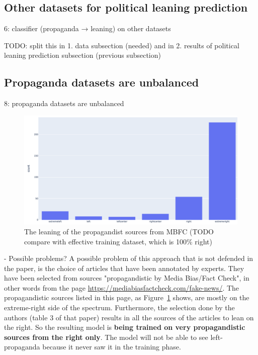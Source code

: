 \subsection{Other datasets for political leaning prediction}
6: classifier (propaganda → leaning) on other datasets

TODO: split this in 
1. data subsection (needed) and in
2. results of political leaning prediction subsection (previous subsection)

\subsection{Propaganda datasets are unbalanced}

8: propaganda datasets are unbalanced

\begin{figure}[!htb]
   \centering
   \includegraphics[width=\linewidth]{figures/leaning_questionable.png}
   \caption{The leaning of the propagandist sources from MBFC (TODO compare with effective training dataset, which is 100\% right)}
   \label{fig:mbfc_leaning}
\end{figure}

- Possible problems?
A possible problem of this approach that is not defended in the paper, is the choice of articles that have been annotated by experts. They have been selected from sources "propagandistic by Media Bias/Fact Check", in other words from the page \url{https://mediabiasfactcheck.com/fake-news/}. The propagandistic sources listed in this page, as Figure~\ref{fig:mbfc_leaning} shows, are mostly on the extreme-right side of the spectrum. Furthermore, the selection done by the authors (table 3 of that paper) results in all the sources of the articles to lean on the right.
So the resulting model is \textbf{being trained on very propagandistic sources from the right only}. The model will not be able to see left-propaganda because it never saw it in the training phase.



